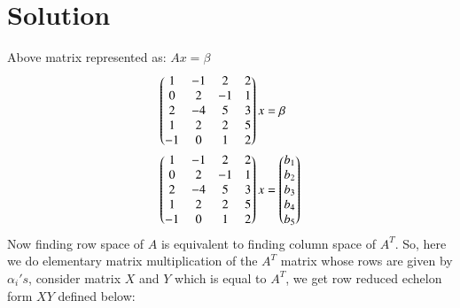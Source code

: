 \documentclass[journal,12pt,twocolumn]{IEEEtran}
\begin{document}
\section{\textbf{Solution}}
Above matrix represented as: $Ax = \beta$
\begin{align}
    \begin{pmatrix}1 & -1 & 2 & 2 \\
                    0 & 2 & -1 & 1 \\
                    2 & -4 & 5 & 3 \\
                    1 & 2 & 2 & 5 \\
                    -1 & 0 & 1 & 2\end{pmatrix}x &= \beta\\
    \begin{pmatrix}1 & -1 & 2 & 2 \\
                    0 & 2 & -1 & 1 \\
                    2 & -4 & 5 & 3 \\
                    1 & 2 & 2 & 5 \\
                    -1 & 0 & 1 & 2\end{pmatrix}x &= 
                    \begin{pmatrix}b_1 \\ b_2 \\ b_3\\ b_4 \\ b_5\end{pmatrix} \label{eq_2}
\end{align}
Now finding row space of $A$ is equivalent to finding column space of $A^T$. So, here we do elementary matrix multiplication of the $A^T$ matrix whose rows are given by $\alpha_i's$, consider matrix $X$ and $Y$ which is equal to $A^T$, we get row reduced echelon form $XY$ defined below:
\end{document}
